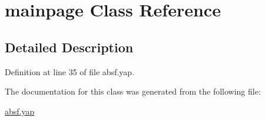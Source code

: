 \section{mainpage Class Reference}
\label{classmainpage}


\subsection{Detailed Description}


Definition at line 35 of file absf.\+yap.



The documentation for this class was generated from the following file\+:\begin{DoxyCompactItemize}
\item 
\hyperlink{absf_8yap}{absf.\+yap}\end{DoxyCompactItemize}
